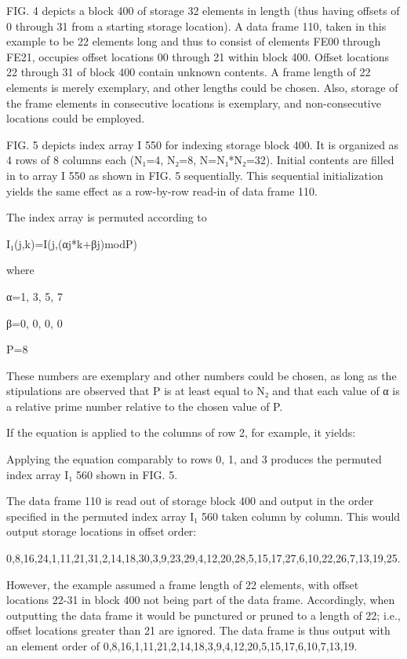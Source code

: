 \documentclass[11pt,a4paper]{article}
\begin{document}
FIG. 4 depicts a block 400 of storage 32 elements in length (thus having offsets of 0 through 31 from a starting storage location). A data frame 110, taken in this example to be 22 elements long and thus to consist of elements FE00 through FE21, occupies offset locations 00 through 21 within block 400. Offset locations 22 through 31 of block 400 contain unknown contents. A frame length of 22 elements is merely exemplary, and other lengths could be chosen. Also, storage of the frame elements in consecutive locations is exemplary, and non-consecutive locations could be employed.

FIG. 5 depicts index array I 550 for indexing storage block 400. It is organized as 4 rows of 8 columns each (N₁=4, N₂=8, N=N₁*N₂=32). Initial contents are filled in to array I 550 as shown in FIG. 5 sequentially. This sequential initialization yields the same effect as a row-by-row read-in of data frame 110.

The index array is permuted according to

I₁(j,k)=I(j,(αj*k+βj)modP)

where

α=1, 3, 5, 7

β=0, 0, 0, 0

P=8

These numbers are exemplary and other numbers could be chosen, as long as the stipulations are observed that P is at least equal to N₂ and that each value of α is a relative prime number relative to the chosen value of P.

If the equation is applied to the columns of row 2, for example, it yields:

Applying the equation comparably to rows 0, 1, and 3 produces the permuted index array I₁ 560 shown in FIG. 5.

The data frame 110 is read out of storage block 400 and output in the order specified in the permuted index array I₁ 560 taken column by column. This would output storage locations in offset order:

0,8,16,24,1,11,21,31,2,14,18,30,3,9,23,29,4,12,20,28,5,15,17,27,6,10,22,26,7,13,19,25.

However, the example assumed a frame length of 22 elements, with offset locations 22-31 in block 400 not being part of the data frame. Accordingly, when outputting the data frame it would be punctured or pruned to a length of 22; i.e., offset locations greater than 21 are ignored. The data frame is thus output with an element order of 0,8,16,1,11,21,2,14,18,3,9,4,12,20,5,15,17,6,10,7,13,19.
\end{document}
